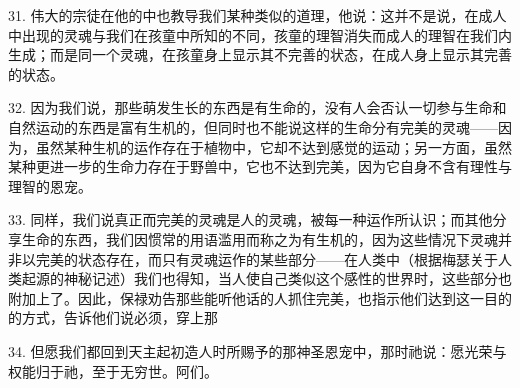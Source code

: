 31. 伟大的宗徒在他的中也教导我们某种类似的道理，他说：这并不是说，在成人中出现的灵魂与我们在孩童中所知的不同，孩童的理智消失而成人的理智在我们内生成；而是同一个灵魂，在孩童身上显示其不完善的状态，在成人身上显示其完善的状态。\par

32. 因为我们说，那些萌发生长的东西是有生命的，没有人会否认一切参与生命和自然运动的东西是富有生机的，但同时也不能说这样的生命分有完美的灵魂——因为，虽然某种生机的运作存在于植物中，它却不达到感觉的运动；另一方面，虽然某种更进一步的生命力存在于野兽中，它也不达到完美，因为它自身不含有理性与理智的恩宠。\par

33. 同样，我们说真正而完美的灵魂是人的灵魂，被每一种运作所认识；而其他分享生命的东西，我们因惯常的用语滥用而称之为有生机的，因为这些情况下灵魂并非以完美的状态存在，而只有灵魂运作的某些部分——在人类中（根据梅瑟关于人类起源的神秘记述）我们也得知，当人使自己类似这个感性的世界时，这些部分也附加上了。因此，保禄劝告那些能听他话的人抓住完美，也指示他们达到这一目的的方式，告诉他们说必须，穿上那\par

34. 但愿我们都回到天主起初造人时所赐予的那神圣恩宠中，那时祂说：愿光荣与权能归于祂，至于无穷世。阿们。\par

